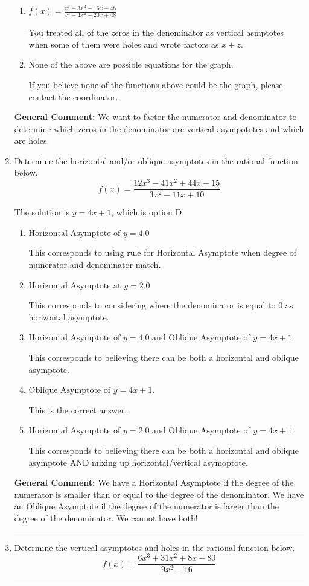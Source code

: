 \documentclass{extbook}[14pt]
\newcommand{\litem}[1]{\item #1

\rule{\textwidth}{0.4pt}}
\begin{document}
\begin{enumerate}
{\begin{enumerate}[label=\Alph*.]
Remember that factors are written as $x-z$. For example, the zero $x=-6$ corresponds to the factor $x-(-6)$.
\item \( f(x)=\frac{x^{3} +3 x^{2} -16 x -48}{x^{3} -4 x^{2} -20 x + 48} \)

You treated all of the zeros in the denominator as vertical asmptotes when some of them were holes and wrote factors as $x+z$.
\item \( \text{None of the above are possible equations for the graph.} \)

If you believe none of the functions above could be the graph, please contact the coordinator.
\end{enumerate}

\textbf{General Comment:} We want to factor the numerator and denominator to determine which zeros in the denominator are vertical asympototes and which are holes.
}
\litem{
Determine the horizontal and/or oblique asymptotes in the rational function below.
\[ f(x) = \frac{12x^{3} -41 x^{2} +44 x -15}{3x^{2} -11 x + 10} \]

The solution is \( y = 4x + 1 \), which is option D.\begin{enumerate}[label=\Alph*.]
\item \( \text{Horizontal Asymptote of } y = 4.0  \)

This corresponds to using rule for Horizontal Asymptote when degree of numerator and denominator match.
\item \( \text{Horizontal Asymptote at } y = 2.0 \)

This corresponds to considering where the denominator is equal to 0 as horizontal asymptote.
\item \( \text{Horizontal Asymptote of } y = 4.0 \text{ and Oblique Asymptote of } y = 4x + 1 \)

This corresponds to believing there can be both a horizontal and oblique asymptote.
\item \( \text{Oblique Asymptote of } y = 4x + 1. \)

This is the correct answer.
\item \( \text{Horizontal Asymptote of } y = 2.0 \text{ and Oblique Asymptote of } y = 4x + 1 \)

This corresponds to believing there can be both a horizontal and oblique asymptote AND mixing up horizontal/vertical asymoptote.
\end{enumerate}

\textbf{General Comment:} We have a Horizontal Asymptote if the degree of the numerator is smaller than or equal to the degree of the denominator. We have an Oblique Asymptote if the degree of the numerator is larger than the degree of the denominator. We cannot have both!
}
\litem{
Determine the vertical asymptotes and holes in the rational function below.
\[ f(x) = \frac{6x^{3} +31 x^{2} +8 x -80}{9x^{2} -16} \]

}
\end{enumerate}
\end{document}
